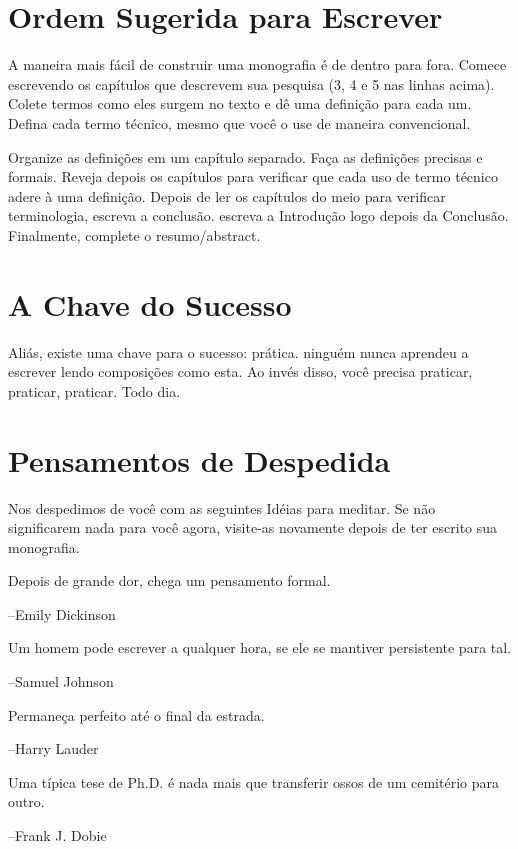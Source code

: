 \section{Ordem Sugerida para Escrever}

A maneira mais f\'{a}cil de construir uma monografia \'{e} de dentro para fora. Comece escrevendo os cap\'{i}tulos que descrevem sua pesquisa (3, 4 e 5 nas linhas acima). Colete termos como eles surgem no texto e dê uma defini\c{c}\~{a}o para cada um.
Defina cada termo t\'{e}cnico,  mesmo que você o use de maneira convencional.

Organize as defini\c{c}\~{o}es em um cap\'{i}tulo separado. Fa\c{c}a as defini\c{c}\~{o}es precisas e formais. Reveja depois os cap\'{i}tulos para verificar que cada uso de termo t\'{e}cnico adere à uma defini\c{c}\~{a}o. Depois de ler os cap\'{i}tulos do meio para verificar terminologia, escreva a conclus\~{a}o. escreva a Introdu\c{c}\~{a}o logo depois da Conclus\~{a}o. Finalmente, complete o resumo/abstract.

\section{A Chave do Sucesso}

Ali\'{a}s, existe uma chave para o sucesso: pr\'{a}tica. ningu\'{e}m nunca aprendeu a escrever lendo composi\c{c}\~{o}es como esta. Ao inv\'{e}s disso, você precisa praticar, praticar, praticar. Todo dia.

\section{Pensamentos de Despedida}

Nos despedimos de você com as seguintes Id\'{e}ias para meditar. Se n\~{a}o significarem nada para você agora, visite-as novamente depois de ter escrito sua monografia.

	

	\indent\indent Depois de grande dor, chega um pensamento formal.

		\indent \indent \indent --Emily Dickinson

		
	\indent\indent Um homem pode escrever a qualquer hora, se ele se mantiver persistente para tal.

		\indent \indent \indent --Samuel Johnson

		
	\indent\indent Permane\c{c}a perfeito at\'{e} o final da estrada.

		\indent \indent \indent --Harry Lauder

	 
	\indent\indent Uma t\'{i}pica tese de Ph.D. \'{e} nada mais que transferir ossos de um cemit\'{e}rio para outro.

		\indent \indent \indent --Frank J. Dobie

	
	
	
	
	
	
	
	








	
	
	
	
	
	
	
	
	
	
	
	
	
	
